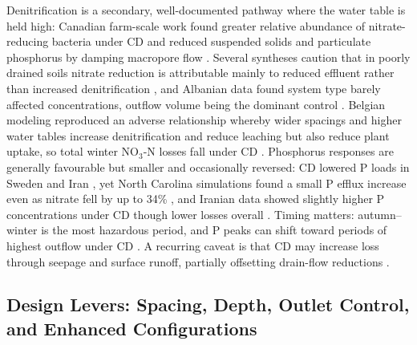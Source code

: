 Denitrification is a secondary, well-documented pathway where the water table is
held high: Canadian farm-scale work found greater relative abundance of
nitrate-reducing bacteria under CD and reduced suspended solids and particulate
phosphorus by damping macropore flow \parencite{Tanga2025}. Several syntheses
caution that in poorly drained soils nitrate reduction is attributable mainly to
reduced effluent rather than increased denitrification \parencite{THOMAS1995},
and Albanian data found system type barely affected concentrations, outflow
volume being the dominant control \parencite{Grazhdani1996}. Belgian modeling
reproduced an adverse relationship whereby wider spacings and higher water tables
increase denitrification and reduce leaching but also reduce plant uptake, so
total winter NO$_3$-N losses fall under CD \parencite{ElSadek2002,ElSadek2002b}.
Phosphorus responses are generally favourable but smaller and occasionally
reversed: CD lowered P loads in Sweden and Iran
\parencite{Wesström2007,Wesström2001,Jouni2018}, yet North Carolina simulations
found a small P efflux increase even as nitrate fell by up to 34\%
\parencite{DEAL1986}, and Iranian data showed slightly higher P concentrations
under CD though lower losses overall \parencite{Jouni2018}. Timing matters:
autumn--winter is the most hazardous period, and P peaks can shift toward periods
of highest outflow under CD \parencite{Tolomio2018,Wesström2007}. A recurring
caveat is that CD may increase loss through seepage and surface runoff, partially
offsetting drain-flow reductions \parencite{Frankenberger2024}.

\subsection{Design Levers: Spacing, Depth, Outlet Control, and Enhanced Configurations}

